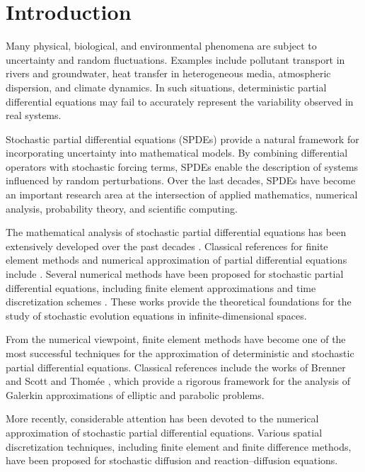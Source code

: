 \section{Introduction}

Many physical, biological, and environmental phenomena are subject to uncertainty and random fluctuations. 
Examples include pollutant transport in rivers and groundwater, heat transfer in heterogeneous media, 
atmospheric dispersion, and climate dynamics. In such situations, deterministic partial differential 
equations may fail to accurately represent the variability observed in real systems.

Stochastic partial differential equations (SPDEs) provide a natural framework for incorporating uncertainty 
into mathematical models. By combining differential operators with stochastic forcing terms, SPDEs enable 
the description of systems influenced by random perturbations. Over the last decades, SPDEs have become an 
important research area at the intersection of applied mathematics, numerical analysis, probability theory,
and scientific computing.

The mathematical analysis of stochastic partial differential equations has been extensively developed over the past decades
\cite{DaPrato2014,LiuRockner2015,LordPowellShardlow2014}.
Classical references for finite element methods and numerical approximation of partial differential equations include
\cite{BrennerScott2008,Thomee2006,QuarteroniValli2008,Evans2010,LarssonThomee2003}.
Several numerical methods have been proposed for stochastic partial differential equations, including finite element approximations and time discretization schemes
\cite{Printems2001,KovacsLarssonLindgren2015,CarelliProhl2012}. 
These works provide the theoretical foundations for the study of stochastic evolution equations in 
infinite-dimensional spaces.

From the numerical viewpoint, finite element methods have become one of the most successful techniques for 
the approximation of deterministic and stochastic partial differential equations. Classical references 
include the works of Brenner and Scott \cite{BrennerScott2008} and Thomée \cite{Thomee2006}, which provide 
a rigorous framework for the analysis of Galerkin approximations of elliptic and parabolic problems.

More recently, considerable attention has been devoted to the numerical approximation of stochastic partial 
differential equations. Various spatial discretization techniques, including finite element and finite 
difference methods, have been proposed for stochastic diffusion and reaction--diffusion equations. 

